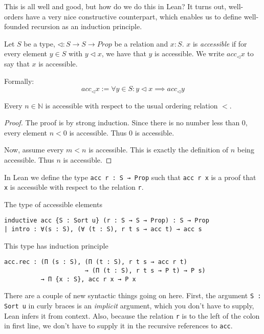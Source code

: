 \documentclass[a4paper, 12pt]{article}
\newcommand{\N}{\mathbb{N}}
\newcommand{\Prop}{\mathit{Prop}}
\renewcommand{\Prop}{\mathit{Prop}}
\newcommand{\lean}[1]{\texttt{#1}}
\theoremstyle{changedot}
\theoremstyle{changedotbreak}
\theoremstyle{nonumberplain}
\newtheorem{proof}{Proof}
\begin{document}
This is all well and good, but how do we do this in Lean? It turns out, well-orders have a very nice constructive counterpart, which enables us to define well-founded recursion as an induction principle.

\begin{definition}
  Let $S$ be a type, $\lhd : S \to S \to \Prop$ be a relation and $x : S$. $x$ is \textit{accessible} if for every element $y \in S$ with $y \lhd x$, we have that $y$ is accessible. We write $acc_{\lhd} x$ to say that $x$ is accessible.

  Formally: \[acc_{\lhd} x := \forall y \in S: y \lhd x \implies acc_{\lhd} y\]
\end{definition}

\begin{proposition}
  Every $n \in \N$ is accessible with respect to the usual ordering relation $<$.
\end{proposition}
\begin{proof}
  The proof is by strong induction. Since there is no number less than $0$, every element $n < 0$ is accessible. Thus $0$ is accessible.

  Now, assume every $m < n$ is accessible. This is exactly the definition of $n$ being accessible. Thus $n$ is accessible.
\end{proof}


In Lean we define the type \lean{acc r : S → Prop} such that \lean{acc r x} is a proof that \lean{x} is accessible with respect to the relation \lean{r}.

\begin{definition}
  The type of accessible elements
\begin{verbatim}
inductive acc {S : Sort u} (r : S → S → Prop) : S → Prop
| intro : ∀(s : S), (∀ (t : S), r t s → acc t) → acc s
\end{verbatim}

  This type has induction principle

\begin{verbatim}
acc.rec : (Π (s : S), (Π (t : S), r t s → acc r t)
                      → (Π (t : S), r t s → P t) → P s)
          → Π {x : S}, acc r x → P x
\end{verbatim}
\end{definition}

There are a couple of new syntactic things going on here. First, the argument \lean{{S : Sort u}} in curly braces is an \textit{implicit} argument, which you don't have to supply, Lean infers it from context. Also, because the relation \lean{r} is to the left of the colon in first line, we don't have to supply it in the recursive references to \lean{acc}.
\end{document}
